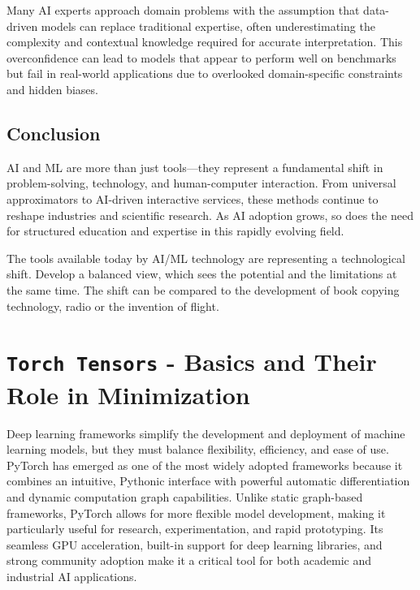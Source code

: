 Many AI experts approach domain problems with the assumption that data-driven models can replace traditional expertise, often underestimating the complexity and contextual knowledge required for accurate interpretation. This overconfidence can lead to models that appear to perform well on benchmarks but fail in real-world applications due to overlooked domain-specific constraints and hidden biases.

\subsection{Conclusion}

AI and ML are more than just tools—they represent a fundamental shift in problem-solving, technology, and human-computer interaction. From universal approximators to AI-driven interactive services, these methods continue to reshape industries and scientific research. As AI adoption grows, so does the need for structured education and expertise in this rapidly evolving field.

\begin{recommendationbox}
The tools available today by AI/ML technology are representing a technological shift. Develop a balanced view, which sees the potential and the limitations at the same time. The shift can be compared to the development of book copying technology, radio or the invention of flight. 
\end{recommendationbox}

%
\section{\texttt{Torch Tensors} - Basics and Their Role in Minimization}

Deep learning frameworks simplify the development and deployment of machine learning models, but they must balance flexibility, efficiency, and ease of use. PyTorch has emerged as one of the most widely adopted frameworks because it combines an intuitive, Pythonic interface with powerful automatic differentiation and dynamic computation graph capabilities. Unlike static graph-based frameworks, PyTorch allows for more flexible model development, making it particularly useful for research, experimentation, and rapid prototyping. Its seamless GPU acceleration, built-in support for deep learning libraries, and strong community adoption make it a critical tool for both academic and industrial AI applications.


